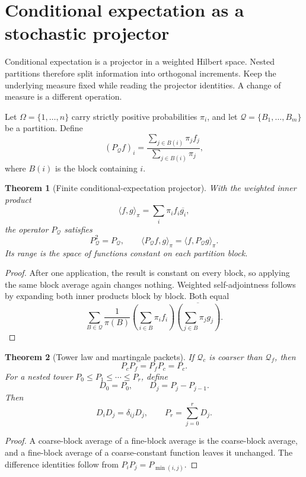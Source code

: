 \documentclass[11pt,letterpaper]{article}
\newtheorem{theorem}{Theorem}[section]
\theoremstyle{plain}
\theoremstyle{plain}
\theoremstyle{plain}
\theoremstyle{definition}
\theoremstyle{definition}
\theoremstyle{definition}
\theoremstyle{definition}
\theoremstyle{definition}
\theoremstyle{remark}
\theoremstyle{remark}
\theoremstyle{remark}
\theoremstyle{remark}
\theoremstyle{remark}
\theoremstyle{remark}
\let\KomorebiPrimitiveMathcal\mathcal
\renewcommand{\mathcal}[1]{{\KomorebiPrimitiveMathcal{#1}}}
\begin{document}
\FloatBarrier
\section{Conditional expectation as a stochastic projector}\label{core:section:06}
\begin{readerroadmap}
Conditional expectation is a projector in a weighted Hilbert space. Nested partitions therefore split information into orthogonal increments. Keep the underlying measure fixed while reading the projector identities. A change of measure is a different operation.
\end{readerroadmap}


Let $\Omega=\{1,\ldots,n\}$ carry strictly positive probabilities $\pi_i$, and let $\mathcal Q=\{B_1,\ldots,B_m\}$ be a partition. Define
\[
(P_{\mathcal Q}f)_i
=
\frac{\sum_{j\in B(i)}\pi_jf_j}{\sum_{j\in B(i)}\pi_j},
\]
where $B(i)$ is the block containing $i$.

\begin{theorem}[Finite conditional-expectation projector]\label{core:record:014}
With the weighted inner product
\[
\langle f,g\rangle_\pi=\sum_i\pi_if_i\overline{g_i},
\]
the operator $P_{\mathcal Q}$ satisfies
\[
P_{\mathcal Q}^2=P_{\mathcal Q},
\qquad
\langle P_{\mathcal Q}f,g\rangle_\pi
=
\langle f,P_{\mathcal Q}g\rangle_\pi.
\]
Its range is the space of functions constant on each partition block.
\end{theorem}

\begin{proof}
After one application, the result is constant on every block, so applying the same block average again changes nothing. Weighted self-adjointness follows by expanding both inner products block by block. Both equal
\[
\sum_{B\in\mathcal Q}
\frac{1}{\pi(B)}
\left(\sum_{i\in B}\pi_i f_i\right)
\overline{\left(\sum_{j\in B}\pi_j g_j\right)}.
\]
\end{proof}

\begin{theorem}[Tower law and martingale packets]\label{core:record:015}
If $\mathcal Q_c$ is coarser than $\mathcal Q_f$, then
\[
\boxed{
P_cP_f=P_fP_c=P_c.
}
\]
For a nested tower $P_0\le P_1\le\cdots\le P_r$, define
\[
D_0=P_0,
\qquad
D_j=P_j-P_{j-1}.
\]
Then
\[
D_iD_j=\delta_{ij}D_j,
\qquad
P_r=\sum_{j=0}^rD_j.
\]
\end{theorem}

\begin{proof}
A coarse-block average of a fine-block average is the coarse-block average, and a fine-block average of a coarse-constant function leaves it unchanged. The difference identities follow from $P_iP_j=P_{\min(i,j)}$.
\end{proof}
\end{document}
